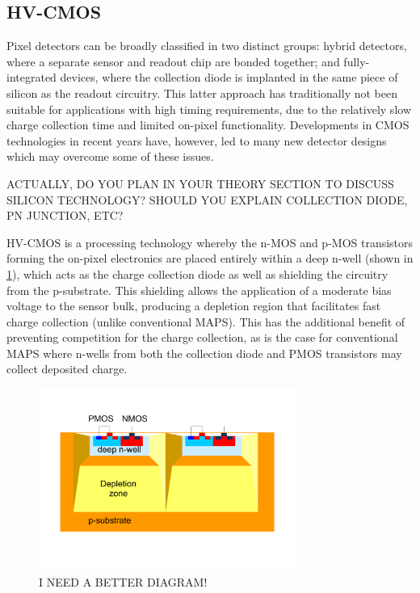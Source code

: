 
\subsection{HV-CMOS}

Pixel detectors can be broadly classified in two distinct groups: hybrid detectors, where a separate sensor and readout chip are bonded together; and fully-integrated devices, where the collection diode is implanted in the same piece of silicon as the readout circuitry. This latter approach has traditionally not been suitable for applications with high timing requirements, due to the relatively slow charge collection time and limited on-pixel functionality. Developments in CMOS technologies in recent years have, however, led to many new detector designs which may overcome some of these issues. 

ACTUALLY, DO YOU PLAN IN YOUR THEORY SECTION TO DISCUSS SILICON TECHNOLOGY? SHOULD YOU EXPLAIN COLLECTION DIODE, PN JUNCTION, ETC?

HV-CMOS is a processing technology whereby the n-MOS and p-MOS transistors forming the on-pixel electronics are placed entirely within a deep n-well (shown in  \ref{fig:hvcmos}), which acts as the charge collection diode as well as shielding the circuitry from the p-substrate. This shielding allows the application of a moderate bias voltage to the sensor bulk, producing a depletion region that facilitates fast charge collection (unlike conventional MAPS). This has the additional benefit of preventing competition for the charge collection, as is the case for conventional MAPS where n-wells from both the collection diode and PMOS transistors may collect deposited charge.

\begin{figure}
\centering
\includegraphics[width=0.75\textwidth]{CLICdpVertex/Plots/HV-CMOSDiagram.pdf}
\caption[HV-CMOS diagram.]{I NEED A BETTER DIAGRAM!}
\label{fig:hvcmos}
\end{figure}

